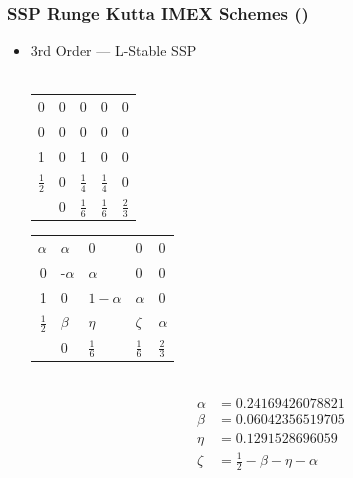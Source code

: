 \documentclass[10pt]{beamer}
\begin{document}
\begin{frame}
  \frametitle{SSP Runge Kutta IMEX Schemes (\textcite{pareschi2005implicit})}
  \begin{itemize}
    \item 3rd Order --- L-Stable SSP \hfill \\ \hfill \\
          \begin{tabular}{r|llll}
            0               & 0 & 0               & 0               & 0               \\
            0               & 0 & 0               & 0               & 0               \\
            1               & 0 & 1               & 0               & 0               \\
            \(\frac{1}{2}\) & 0 & \(\frac{1}{4}\) & \(\frac{1}{4}\) & 0               \\
            \midrule
                            & 0 & \(\frac{1}{6}\) & \(\frac{1}{6}\) & \(\frac{2}{3}\) \\
          \end{tabular} \hspace{0.5cm}
          \begin{tabular}{r|llll}
            \(\alpha \)     & \(\alpha \)  & 0               & 0               & 0               \\
            0               & -\(\alpha \) & \(\alpha \)     & 0               & 0               \\
            1               & 0            & \(1 - \alpha \) & \(\alpha \)     & 0               \\
            \(\frac{1}{2}\) & \(\beta \)   & \(\eta \)       & \(\zeta \)      & \(\alpha \)     \\
            \midrule
                            & 0            & \(\frac{1}{6}\) & \(\frac{1}{6}\) & \(\frac{2}{3}\) \\
          \end{tabular} \\
          \begin{align*}
            \alpha & = 0.24169426078821                    \\
            \beta  & = 0.06042356519705                    \\
            \eta   & = 0.1291528696059                     \\
            \zeta  & = \frac{1}{2} - \beta - \eta - \alpha
          \end{align*}
  \end{itemize}
\end{frame}
\end{document}
